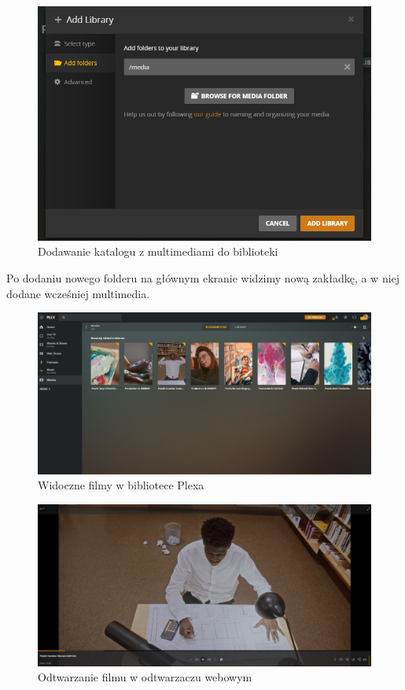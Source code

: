 \documentclass[12pt,a4paper]{article}
\newcommand{\<}{\langle}
\renewcommand{\>}{\rangle}
\theoremstyle{definition}
\begin{document}
\begin{figure}[H]
    \centering
    \includegraphics[width=\linewidth]{img/ss_plex/21.png}
    \caption{Dodawanie katalogu z multimediami do biblioteki}
\end{figure}

Po dodaniu nowego folderu na głównym ekranie widzimy nową zakładkę, a w niej dodane wcześniej multimedia.

\begin{figure}[H]
    \centering
    \includegraphics[width=\linewidth]{img/ss_plex/23.png}
    \caption{Widoczne filmy w bibliotece Plexa}
\end{figure}

\begin{figure}[H]
    \centering
    \includegraphics[width=\linewidth]{img/ss_plex/24.png}
    \caption{Odtwarzanie filmu w odtwarzaczu webowym}
\end{figure}
\end{document}
